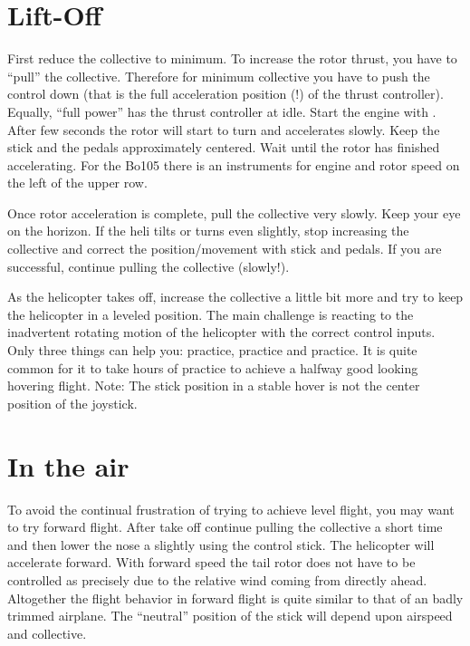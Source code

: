 
\section{Lift-Off}

First reduce the collective to minimum. To increase the rotor thrust, you have 
to ``pull'' the collective. Therefore for minimum collective you have to push 
the control down (that is the full acceleration position (!) of the thrust 
controller). Equally, ``full power'' has the thrust controller at idle. 
Start the engine with \key{\}}. After few seconds the rotor will start to 
turn and accelerates slowly. Keep the stick and the pedals approximately 
centered. Wait until the rotor has finished accelerating. For the Bo105 there 
is an instruments for engine and rotor speed on the left of the upper row. 

Once rotor acceleration is complete, pull the collective very slowly. Keep 
your eye on the horizon. If the heli tilts or turns even slightly, stop 
increasing the collective and correct the position/movement with stick and 
pedals. If you are successful, continue pulling the collective (slowly!). 

As the helicopter takes off, increase the collective a little bit more and try 
to keep the helicopter in a leveled position. The main challenge is reacting 
to the inadvertent rotating motion of the helicopter with the correct control 
inputs. Only three things can help you: practice, practice and practice. 
It is quite common for it to take hours of practice to achieve a halfway good 
looking hovering flight. Note: The stick position in a stable hover is not 
the center position of the joystick. 

\section{In the air}
 
To avoid the continual frustration of trying to achieve level flight, you may 
want to try forward flight. After take off continue pulling the collective a 
short time and then lower the nose a slightly using the control stick. The 
helicopter will accelerate forward. With forward speed the tail rotor does not 
have to be controlled as precisely due to the relative wind coming from 
directly ahead. Altogether the flight behavior in forward flight is quite 
similar to that of an badly trimmed airplane. The ``neutral'' position of the 
stick will depend upon airspeed and collective. 

